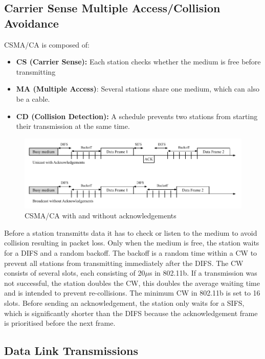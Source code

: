 \subsection*{Carrier Sense Multiple Access/Collision Avoidance}

\ac{CSMA/CA} is composed of:
\begin{itemize}
	\setlength\itemsep{-0.0em}
	\item \textbf{CS (Carrier Sense):} Each station checks whether the medium is free before transmitting
	\item \textbf{MA (Multiple Access)}: Several stations share one medium, which can also be a cable.
	\item \textbf{CD (Collision Detection):} A schedule prevents two stations from starting their transmission at the same time.
\end{itemize}

\begin{figure}[h]
	\centering
	\includegraphics[scale=0.75]{figures/CSMA_CD.pdf}
	\caption{CSMA/CA with and without acknowledgements}
	\label{fig:CSMACD}
\end{figure}

Before a station transmitts data it has to check or listen to the medium to avoid collision resulting in packet loss.
Only when the medium is free, the station waits for a \ac{DIFS} and a random backoff.
The backoff is a random time within a \ac{CW} to prevent all stations from transmitting immediately after the \ac{DIFS}.
The \ac{CW} consists of several slots, each consisting of 20$\mu$s in 802.11b.
If a transmission was not successful, the station doubles the \ac{CW}, 
this doubles the average waiting time and is intended to prevent re-collisions.
The minimum \ac{CW} in 802.11b is set to 16 slots.
Before sending an acknowledgement, the station only waits for a \ac{SIFS}, 
which is significantly shorter than the \ac{DIFS} because the acknowledgement frame is prioritised before the next frame.

\subsection*{Data Link Transmissions}

